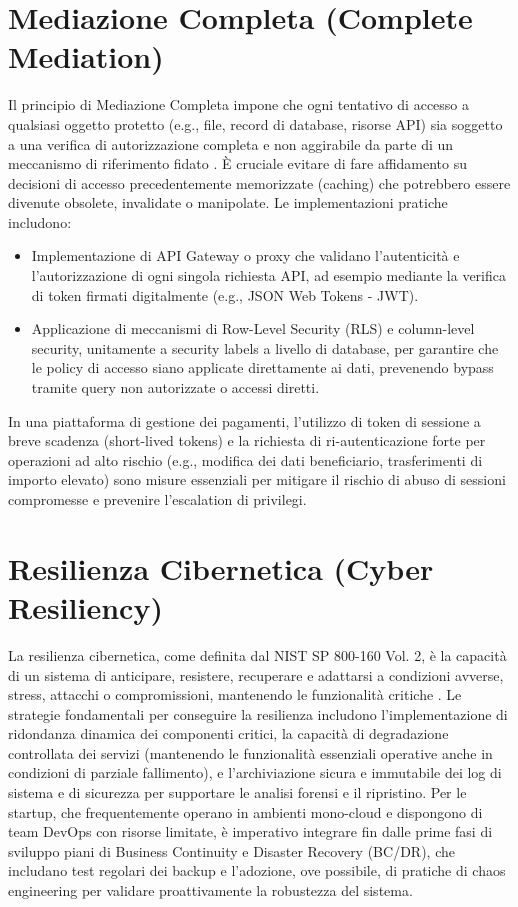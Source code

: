 \section{Mediazione Completa (Complete Mediation)}
Il principio di Mediazione Completa impone che ogni tentativo di accesso a qualsiasi oggetto protetto (e.g., file, record di database, risorse API) sia soggetto a una verifica di autorizzazione completa e non aggirabile da parte di un meccanismo di riferimento fidato \cite{Saltzer_Schroeder_1975}. È cruciale evitare di fare affidamento su decisioni di accesso precedentemente memorizzate (caching) che potrebbero essere divenute obsolete, invalidate o manipolate.
Le implementazioni pratiche includono:
\begin{itemize}
\item Implementazione di API Gateway o proxy che validano l'autenticità e l'autorizzazione di ogni singola richiesta API, ad esempio mediante la verifica di token firmati digitalmente (e.g., JSON Web Tokens - JWT).
\item Applicazione di meccanismi di Row-Level Security (RLS) e column-level security, unitamente a security labels a livello di database, per garantire che le policy di accesso siano applicate direttamente ai dati, prevenendo bypass tramite query non autorizzate o accessi diretti.
\end{itemize}
In una piattaforma di gestione dei pagamenti, l'utilizzo di token di sessione a breve scadenza (short-lived tokens) e la richiesta di ri-autenticazione forte per operazioni ad alto rischio (e.g., modifica dei dati beneficiario, trasferimenti di importo elevato) sono misure essenziali per mitigare il rischio di abuso di sessioni compromesse e prevenire l'escalation di privilegi.
\section{Resilienza Cibernetica (Cyber Resiliency)}
La resilienza cibernetica, come definita dal NIST SP 800-160 Vol. 2, è la capacità di un sistema di anticipare, resistere, recuperare e adattarsi a condizioni avverse, stress, attacchi o compromissioni, mantenendo le funzionalità critiche \cite{NIST_SP_800_160v2_2019}. Le strategie fondamentali per conseguire la resilienza includono l'implementazione di ridondanza dinamica dei componenti critici, la capacità di degradazione controllata dei servizi (mantenendo le funzionalità essenziali operative anche in condizioni di parziale fallimento), e l'archiviazione sicura e immutabile dei log di sistema e di sicurezza per supportare le analisi forensi e il ripristino. Per le startup, che frequentemente operano in ambienti mono-cloud e dispongono di team DevOps con risorse limitate, è imperativo integrare fin dalle prime fasi di sviluppo piani di Business Continuity e Disaster Recovery (BC/DR), che includano test regolari dei backup e l'adozione, ove possibile, di pratiche di chaos engineering per validare proattivamente la robustezza del sistema.
